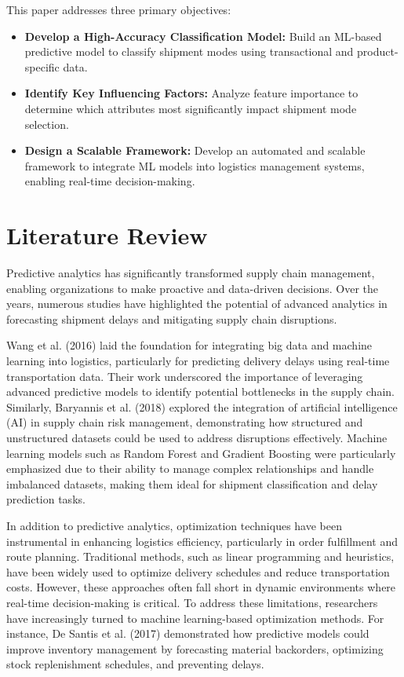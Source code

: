 \documentclass[conference]{IEEEtran}
\begin{document}
This paper addresses three primary objectives:
\begin{itemize}
    \item \textbf{Develop a High-Accuracy Classification Model:} Build an ML-based predictive model to classify shipment modes using transactional and product-specific data.
    \item \textbf{Identify Key Influencing Factors:} Analyze feature importance to determine which attributes most significantly impact shipment mode selection.
    \item \textbf{Design a Scalable Framework:} Develop an automated and scalable framework to integrate ML models into logistics management systems, enabling real-time decision-making.
\end{itemize}

\section{Literature Review}
Predictive analytics has significantly transformed supply chain management, enabling organizations to make proactive and data-driven decisions. Over the years, numerous studies have highlighted the potential of advanced analytics in forecasting shipment delays and mitigating supply chain disruptions.

Wang et al. (2016) laid the foundation for integrating big data and machine learning into logistics, particularly for predicting delivery delays using real-time transportation data. Their work underscored the importance of leveraging advanced predictive models to identify potential bottlenecks in the supply chain. Similarly, Baryannis et al. (2018) explored the integration of artificial intelligence (AI) in supply chain risk management, demonstrating how structured and unstructured datasets could be used to address disruptions effectively. Machine learning models such as Random Forest and Gradient Boosting were particularly emphasized due to their ability to manage complex relationships and handle imbalanced datasets, making them ideal for shipment classification and delay prediction tasks.

In addition to predictive analytics, optimization techniques have been instrumental in enhancing logistics efficiency, particularly in order fulfillment and route planning. Traditional methods, such as linear programming and heuristics, have been widely used to optimize delivery schedules and reduce transportation costs. However, these approaches often fall short in dynamic environments where real-time decision-making is critical. To address these limitations, researchers have increasingly turned to machine learning-based optimization methods. For instance, De Santis et al. (2017) demonstrated how predictive models could improve inventory management by forecasting material backorders, optimizing stock replenishment schedules, and preventing delays.
\end{document}
